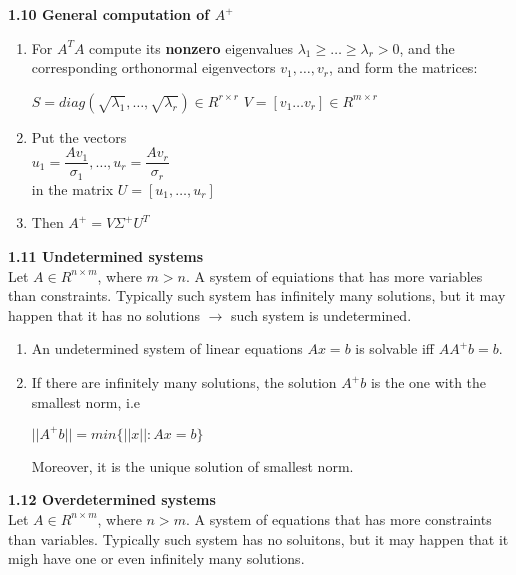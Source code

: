 \documentclass{article}
\begin{document}
\begin{multicols}{3}
\textbf{1.10 General computation of $A^+$}
\begin{enumerate}
    \item For $A^TA$ compute its \textbf{nonzero} eigenvalues
        $\lambda_1 \geq \dots \geq \lambda_r > 0$, and the corresponding
        orthonormal eigenvectors $v_1, \dots, v_r$, and form the matrices:
        \begin{center}
            \begin{math}
                S = diag(\sqrt{\lambda_1}, \dots, \sqrt{\lambda_r}) \in R^{r \times r}
            \end{math}
            \begin{math}
                V = [v_1 \dots v_r] \in R^{m \times r}
            \end{math}
        \end{center}
    \item Put the vectors \\
         \begin{math}
             u_1 = \dfrac{Av_1}{\sigma_1}, \dots, u_r = \dfrac{Av_r}{\sigma_r}
        \end{math}\\ 
        in the matrix $U = [u_1, \dots, u_r]$
    \item Then $A^+ = V \Sigma^+ U^T$
\end{enumerate}

\textbf{1.11 Undetermined systems}\\
Let $A \in R^{n \times m}$, where $m > n$. A system of equiations that has more variables than
constraints. Typically such system has infinitely many solutions, but it may happen that it has no
solutions $\rightarrow$ such system is undetermined.
\begin{enumerate}
    \item An undetermined system of linear equations $Ax=b$ is solvable iff $AA^+b = b$.
    \item If there are infinitely many solutions, the solution $A^+b$ is the one with the
        smallest norm, i.e
        \begin{center}
            \begin{math}
                || A^+ b || = min\{||x||: Ax = b\}
            \end{math}
        \end{center}
        Moreover, it is the unique solution of smallest norm.
\end{enumerate}

\textbf{1.12 Overdetermined systems}\\
Let $A \in R^{n \times m}$, where $n > m$. A system of equations that has more constraints than
variables. Typically such system has no soluitons, but it may happen that it migh have one or
even infinitely many solutions.


\end{multicols}
\end{document}
